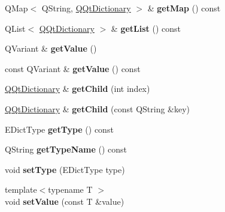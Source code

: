 \begin{DoxyCompactItemize}
\mbox{\label{class_q_qt_dictionary_af539bedcf276472102f662922c617c1e}} 
Q\+Map$<$ Q\+String, \mbox{\hyperlink{class_q_qt_dictionary}{Q\+Qt\+Dictionary}} $>$ \& {\bfseries get\+Map} () const
\item 
\mbox{\label{class_q_qt_dictionary_ae17bdfc858980efb5cd9a11e0c35c530}} 
Q\+List$<$ \mbox{\hyperlink{class_q_qt_dictionary}{Q\+Qt\+Dictionary}} $>$ \& {\bfseries get\+List} () const
\item 
\mbox{\label{class_q_qt_dictionary_a73b40df4e62b42d313b7717d65f9b5d8}} 
Q\+Variant \& {\bfseries get\+Value} ()
\item 
\mbox{\label{class_q_qt_dictionary_a55a2fc5d1ea6685b6a00bc3bf5acc595}} 
const Q\+Variant \& {\bfseries get\+Value} () const
\item 
\mbox{\label{class_q_qt_dictionary_a117826220ac49d8ed7df361b3b649433}} 
\mbox{\hyperlink{class_q_qt_dictionary}{Q\+Qt\+Dictionary}} \& {\bfseries get\+Child} (int index)
\item 
\mbox{\label{class_q_qt_dictionary_a0835aab025508cc7b4b5bca5445b75d0}} 
\mbox{\hyperlink{class_q_qt_dictionary}{Q\+Qt\+Dictionary}} \& {\bfseries get\+Child} (const Q\+String \&key)
\item 
\mbox{\label{class_q_qt_dictionary_ac6a0cbec9ac3e471dbb1889d8d7cda3e}} 
E\+Dict\+Type {\bfseries get\+Type} () const
\item 
\mbox{\label{class_q_qt_dictionary_adc7a06f0c3e643fed35f64bb690a30b1}} 
Q\+String {\bfseries get\+Type\+Name} () const
\item 
\mbox{\label{class_q_qt_dictionary_a03075e4ad003217f22f4c09c9a251fec}} 
void {\bfseries set\+Type} (E\+Dict\+Type type)
\item 
\mbox{\label{class_q_qt_dictionary_a5b1d32e8ed39c14a83d5f15319296e00}} 
{\footnotesize template$<$typename T $>$ }\\void {\bfseries set\+Value} (const T \&value)

\end{DoxyCompactItemize}
